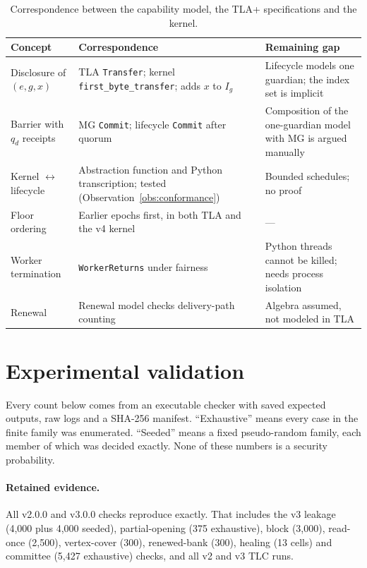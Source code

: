 \documentclass[pdflatex,sn-mathphys-num]{sn-jnl}
\theoremstyle{plain}
\theoremstyle{definition}
\newcommand{\code}[1]{\texttt{#1}}
\begin{document}
\begin{table}[htbp]
\caption{Correspondence between the capability model, the TLA+ specifications and the kernel.}\label{tab:refine}
\centering\footnotesize
\begin{tabularx}{\linewidth}{@{}p{.25\linewidth}YY@{}}\toprule
Concept & Correspondence & Remaining gap\\\midrule
Disclosure of $(e,g,x)$ & TLA \code{Transfer}; kernel \code{first\_byte\_transfer}; adds $x$ to $I_g$ & Lifecycle models one guardian; the index set is implicit\\
Barrier with $q_d$ receipts & MG \code{Commit}; lifecycle \code{Commit} after quorum & Composition of the one-guardian model with MG is argued manually\\
Kernel $\leftrightarrow$ lifecycle & Abstraction function and Python transcription; tested (Observation~\ref{obs:conformance}) & Bounded schedules; no proof\\
Floor ordering & Earlier epochs first, in both TLA and the v4 kernel & ---\\
Worker termination & \code{WorkerReturns} under fairness & Python threads cannot be killed; needs process isolation\\
Renewal & Renewal model checks delivery-path counting & Algebra assumed, not modeled in TLA\\\bottomrule
\end{tabularx}
\end{table}


\section{Experimental validation}\label{sec:evidence}

Every count below comes from an executable checker with saved expected outputs, raw logs and a SHA-256 manifest. ``Exhaustive'' means every case in the finite family was enumerated. ``Seeded'' means a fixed pseudo-random family, each member of which was decided exactly. None of these numbers is a security probability.

\paragraph{Retained evidence.}
All v2.0.0 and v3.0.0 checks reproduce exactly. That includes the v3 leakage (4,000 plus 4,000 seeded), partial-opening (375 exhaustive), block (3,000), read-once (2,500), vertex-cover (300), renewed-bank (300), healing (13 cells) and committee (5,427 exhaustive) checks, and all v2 and v3 TLC runs.
\end{document}
